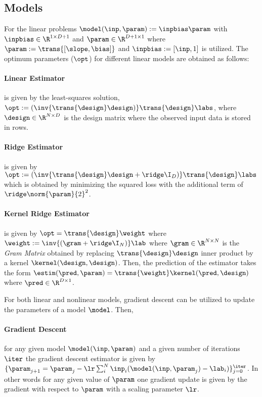 \subsection{Models} 

For the linear problems $\model(\inp, \param):=\inpbias\param$ with $\inpbias\in\R^{1\times D+1}$ and $\param\in\R^{D+1\times 1}$ where $\param:=\trans{[\slope, \bias]}$ and $\inpbias:=[\inp, 1]$ is utilized. The optimum parameters ($\opt$) for different linear models are obtained as follows:

\paragraph{Linear Estimator} is given by the least-squares solution, $\opt:=(\inv{\trans{\design}\design)}\trans{\design}\labs$, where $\design\in\R^{N\times D}$ is the design matrix where the observed input data is stored in rows.

\paragraph{Ridge Estimator} is given by $\opt:=(\inv{\trans{\design}\design+\ridge \I_{D})}\trans{\design}\labs$ which is obtained by minimizing the squared loss with the additional term of $\ridge\norm{\param}{2}^2$. %

\paragraph{Kernel Ridge Estimator} is given by $\opt= \trans{\design}\weight$ where $\weight:=\inv{(\gram+\ridge\I_{N})}\lab$ where $\gram\in\R^{N\times N}$ is the  \textit{Gram Matrix} obtained by replacing $\trans{\design}\design$ inner product by a kernel $\kernel(\design, \design)$. Then, the prediction of the estimator takes the form $\estim(\pred,\param)=\trans{\weight}\kernel(\pred,\design)$ where $\pred\in\R^{D\times 1}$.

For both linear and nonlinear models, gradient descent can be utilized to update the parameters of a model $\model$. Then,

\paragraph{Gradient Descent} for any given model $\model(\inp, \param)$ and a given number of iterations $\iter$ the gradient descent estimator is given by $\{\param_{j+1}=\param_{j} - \lr\sum_i^{N}\inp_i(\model(\inp,\param_j)-\lab_i)\}_{j=0}^{\iter}$. In other words for any given value of $\param$ one gradient update is given by the gradient with respect to $\param$ with a scaling parameter $\lr$. 

